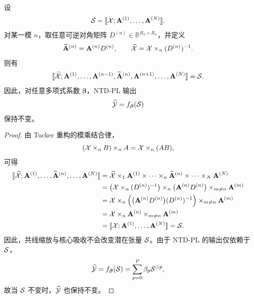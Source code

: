 \begin{proposition}[尺度不变性]
\label{prop:scale_invariance_app}
设
\begin{equation}
\mathcal{S}
=
\llbracket \mathcal{X};\mathbf A^{(1)},\dots,\mathbf A^{(N)}\rrbracket.
\end{equation}
对某一模 $n$，取任意可逆对角矩阵 $D^{(n)}\in\mathbb{R}^{R_n\times R_n}$，并定义
\begin{equation}
\widetilde{\mathbf A}^{(n)} = \mathbf A^{(n)}D^{(n)},\qquad
\widetilde{\mathcal{X}} = \mathcal{X} \times_n (D^{(n)})^{-1}.
\end{equation}
则有
\begin{equation}
\llbracket \widetilde{\mathcal{X}};\mathbf A^{(1)},\dots,\mathbf A^{(n-1)},\widetilde{\mathbf A}^{(n)},\mathbf A^{(n+1)},\dots,\mathbf A^{(N)}\rrbracket
=
\mathcal{S}.
\end{equation}
因此，对任意多项式系数 $\boldsymbol\beta$，NTD-PL 输出
\begin{equation}
\widehat{\mathcal{Y}}=f_{\boldsymbol\beta}(\mathcal{S})
\end{equation}
保持不变。
\end{proposition}

\begin{proof}
由 Tucker 重构的模乘结合律，
\[
(\mathcal{X}\times_n B)\times_n A = \mathcal{X}\times_n (AB),
\]
可得
\begin{align}
\llbracket \widetilde{\mathcal{X}};\mathbf A^{(1)},\dots,\widetilde{\mathbf A}^{(n)},\dots,\mathbf A^{(N)}\rrbracket
&=
\widetilde{\mathcal{X}}\times_1 \mathbf A^{(1)}\times\cdots\times_n \widetilde{\mathbf A}^{(n)}\times\cdots\times_N \mathbf A^{(N)} \\
&=
\bigl(\mathcal{X}\times_n (D^{(n)})^{-1}\bigr)\times_n \bigl(\mathbf A^{(n)}D^{(n)}\bigr)\times_{m\neq n}\mathbf A^{(m)} \\
&=
\mathcal{X}\times_n \Bigl(\bigl(\mathbf A^{(n)}D^{(n)}\bigr)(D^{(n)})^{-1}\Bigr)\times_{m\neq n}\mathbf A^{(m)} \\
&=
\mathcal{X}\times_n \mathbf A^{(n)}\times_{m\neq n}\mathbf A^{(m)} \\
&=
\llbracket \mathcal{X};\mathbf A^{(1)},\dots,\mathbf A^{(N)}\rrbracket
=
\mathcal{S}.
\end{align}
因此，共线缩放与核心吸收不会改变潜在张量 $\mathcal{S}$。由于 NTD-PL 的输出仅依赖于 $\mathcal{S}$，
\begin{equation}
\widehat{\mathcal{Y}}
=
f_{\boldsymbol\beta}(\mathcal{S})
=
\sum_{p=0}^{P}\beta_p \mathcal{S}^{\odot p},
\end{equation}
故当 $\mathcal{S}$ 不变时，$\widehat{\mathcal{Y}}$ 也保持不变。
\end{proof}

